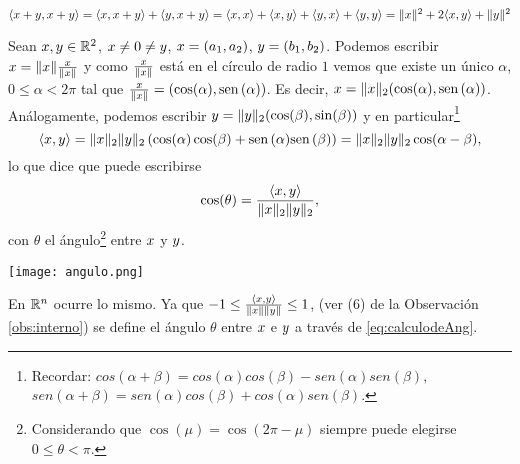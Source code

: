 \begin{ejemplo}
$\langle \xb + \yb, \xb + \yb\rangle = \langle \xb, \xb + \yb\rangle + \langle \yb, \xb + \yb\rangle = \langle \xb, \xb \rangle + \langle \xb, \yb \rangle + \langle \yb, \xb \rangle + \langle \yb, \yb\rangle = \|\xb\|^2 + 2\langle \xb, \yb \rangle + \|\yb\|^2$
\end{ejemplo}
Sean $\xb,\yb\in \R^2$, $\xb\neq \cero\neq \yb$, $\xb=(a_1,a_2)$, $\yb=(b_1,b_2)$.   Podemos escribir $\xb=\|\xb\|\frac{\xb}{\|\xb\|}$ y como $ \frac{\xb}{\|\xb\|}$ está en el círculo de radio $1$ vemos que existe un único $\alpha$, $0\le \alpha<2\pi$ tal que
$ \frac{\xb}{\|\xb\|}=(\cos(\alpha),\sen(\alpha))$. Es decir, $\xb=\|\xb\|_2(\cos(\alpha),\sen(\alpha))$. Análogamente, podemos escribir $\yb=\|\yb\|_2(\cos(\beta),\sin(\beta))$ y en particular\footnote{Recordar: $
cos(\alpha +\beta)=cos(\alpha)cos(\beta)-sen(\alpha)sen(\beta),
$
$
sen(\alpha +\beta)=sen(\alpha)cos(\beta)+cos(\alpha)sen(\beta).
$
}
$$
\langle \xb,\yb\rangle= \|\xb\|_2\|\yb\|_2\left(\cos(\alpha)\cos(\beta)+\sen(\alpha)\sen(\beta)\right)=\|\xb\|_2\|\yb\|_2\cos(\alpha-\beta),
$$
lo que dice que puede escribirse
\begin{equation}
 \label{eq:calculodeAng}
\cos(\theta)=\frac{\langle \xb,\yb\rangle}{\|\xb\|_2\|\yb\|_2},
\end{equation}
con $\theta$ el ángulo\footnote{Considerando que $\cos(\mu)=\cos(2\pi-\mu)$ siempre puede elegirse $0\le \theta < \pi$.} entre $\xb$ y $\yb$.
\begin{center}
 \texttt{[image: angulo.png]}
\end{center}
En $\mathbb R^{n}$ ocurre lo mismo. Ya que $-1\le\frac{\langle \xb, \yb\rangle}{\|\xb\|\|\yb\|}\le 1$, (ver (6) de la Observación \ref{obs:interno}) se define el ángulo $\theta$ entre $\xb$ e $\yb$ a través de \eqref{eq:calculodeAng}.



